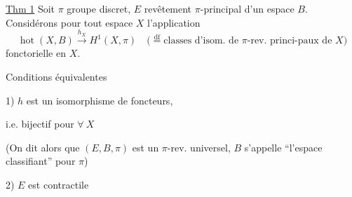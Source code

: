 \uline{Thm 1} Soit $\pi$ groupe discret, $E$ revêtement $\pi$-principal d'un espace $B$.
Considérons pour tout espace $X$ l'application
\[
\operatorname{hot}(X,B)\xrightarrow{h_X}H^1(X,\pi)
\quad\bigl(\overset{\mathrm{df}}=\text{classes d'isom. de $\pi$-rev. princi-paux de $X$}\bigr)
\]
fonctorielle en $X$.

Conditions équivalentes

1) $h$ est un isomorphisme de foncteurs,

\hspace*{2em}i.e. bijectif pour $\forall\ X$

(On dit alors que $(E,B,\pi)$ est un $\pi$-rev. universel, $B$ s'appelle ``l'espace classifiant'' pour $\pi$)

2) $E$ est contractile

